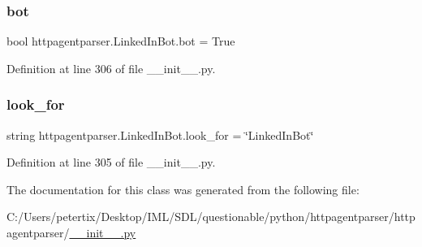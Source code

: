 \subsubsection{\texorpdfstring{bot}{bot}}
{\footnotesize\ttfamily bool httpagentparser.\+Linked\+In\+Bot.\+bot = True\hspace{0.3cm}{\ttfamily [static]}}



Definition at line 306 of file \+\_\+\+\_\+init\+\_\+\+\_\+.\+py.

\hypertarget{classhttpagentparser_1_1_linked_in_bot_a71b26a2eac880bfa8038284745d0c7a2}{}\label{classhttpagentparser_1_1_linked_in_bot_a71b26a2eac880bfa8038284745d0c7a2} 
\subsubsection{\texorpdfstring{look\+\_\+for}{look\_for}}
{\footnotesize\ttfamily string httpagentparser.\+Linked\+In\+Bot.\+look\+\_\+for = \char`\"{}Linked\+In\+Bot\char`\"{}\hspace{0.3cm}{\ttfamily [static]}}



Definition at line 305 of file \+\_\+\+\_\+init\+\_\+\+\_\+.\+py.



The documentation for this class was generated from the following file\+:\begin{DoxyCompactItemize}
\item 
C\+:/\+Users/petertix/\+Desktop/\+I\+M\+L/\+S\+D\+L/questionable/python/httpagentparser/httpagentparser/\hyperlink{____init_____8py}{\+\_\+\+\_\+init\+\_\+\+\_\+.\+py}\end{DoxyCompactItemize}
